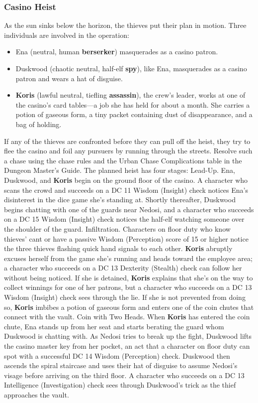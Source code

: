 \documentclass[10pt,a4,twoside,twocolumn,openany,nodeprecatedcode]{dndbook}
\begin{document}
\subsubsection{Casino Heist}
As the sun sinks below the horizon, the thieves put their plan in motion. Three individuals are involved in the operation:
\begin{itemize}

\item Ena (neutral, human \textbf{berserker}) masquerades as a casino patron.
\item Duskwood (chaotic neutral, half-elf \textbf{spy}), like Ena, masquerades as a casino patron and wears a hat of disguise.
\item \textbf{Koris} (lawful neutral, tiefling \textbf{assassin}), the crew's leader, works at one of the casino's card tables—a job she has held for about a month. She carries a potion of gaseous form, a tiny packet containing dust of disappearance, and a bag of holding.
\end{itemize}


If any of the thieves are confronted before they can pull off the heist, they try to flee the casino and foil any pursuers by running through the streets. Resolve such a chase using the chase rules and the Urban Chase Complications table in the Dungeon Master's Guide.
The planned heist has four stages:
{{Lead-Up. Ena, Duskwood, and \textbf{Koris} begin on the ground floor of the casino. A character who scans the crowd and succeeds on a DC 11 Wisdom (Insight) check notices Ena's disinterest in the dice game she's standing at. Shortly thereafter, Duskwood begins chatting with one of the guards near Nedosi, and a character who succeeds on a DC 15 Wisdom (Insight) check notices the half-elf watching someone over the shoulder of the guard.}}
{{Infiltration. Characters on floor duty who know thieves' cant or have a passive Wisdom (Perception) score of 15 or higher notice the three thieves flashing quick hand signals to each other. \textbf{Koris} abruptly excuses herself from the game she's running and heads toward the employee area; a character who succeeds on a DC 13 Dexterity (Stealth) check can follow her without being noticed. If she is detained, \textbf{Koris} explains that she's on the way to collect winnings for one of her patrons, but a character who succeeds on a DC 13 Wisdom (Insight) check sees through the lie. If she is not prevented from doing so, \textbf{Koris} imbibes a potion of gaseous form and enters one of the coin chutes that connect with the vault.}}
{{Coin with Two Heads. When \textbf{Koris} has entered the coin chute, Ena stands up from her seat and starts berating the guard whom Duskwood is chatting with. As Nedosi tries to break up the fight, Duskwood lifts the casino master key from her pocket, an act that a character on floor duty can spot with a successful DC 14 Wisdom (Perception) check. Duskwood then ascends the spiral staircase and uses their hat of disguise to assume Nedosi's visage before arriving on the third floor. A character who succeeds on a DC 13 Intelligence (Investigation) check sees through Duskwood's trick as the thief approaches the vault.}}
\end{document}
